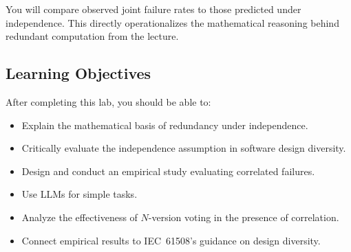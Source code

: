 \documentclass[manuscript,screen,nonacm]{acmart}
\begin{document}
You will compare observed joint failure rates to those predicted under independence.
This directly operationalizes the mathematical reasoning behind redundant computation from the lecture.

\subsection{Learning Objectives}

After completing this lab, you should be able to:

\begin{itemize}
  \item Explain the mathematical basis of redundancy under independence.
  \item Critically evaluate the independence assumption in software design diversity.
  \item Design and conduct an empirical study evaluating correlated failures.
  \item Use LLMs for simple tasks.
  \item Analyze the effectiveness of $N$-version voting in the presence of correlation.
  \item Connect empirical results to IEC~61508’s guidance on design diversity.
\end{itemize}





\clearpage


\clearpage
\nocite{source_example}

 
\end{document}
